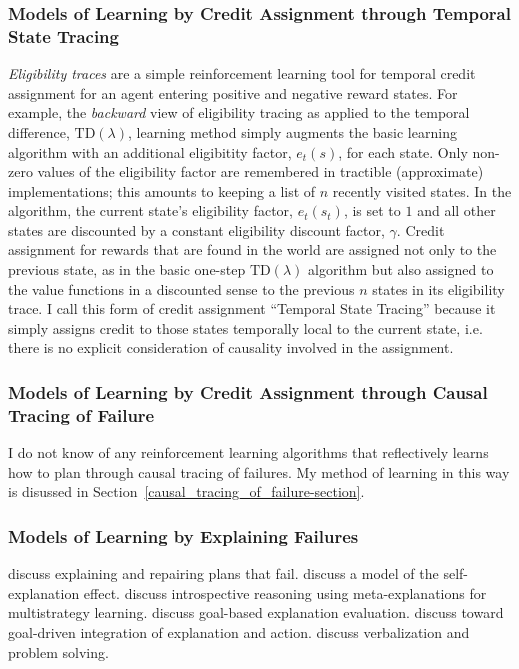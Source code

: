 \subsubsection{Models of Learning by Credit Assignment through Temporal State Tracing}

\emph{Eligibility traces} are a simple reinforcement learning tool for temporal credit assignment for an agent entering positive and negative reward states.
For example, the \emph{backward} view of eligibility tracing as applied to the temporal difference, $\text{TD}(\lambda)$, learning method simply augments the basic learning algorithm with an additional eligibitity factor, $e_t(s)$, for each state.
Only non-zero values of the eligibility factor are remembered in tractible (approximate) implementations; this amounts to keeping a list of $n$ recently visited states.
In the algorithm, the current state's eligibility factor, $e_t(s_t)$, is set to $1$ and all other states are discounted by a constant eligibility discount factor, $\gamma$.
Credit assignment for rewards that are found in the world are assigned not only to the previous state, as in the basic one-step $\text{TD}(\lambda)$ algorithm but also assigned to the value functions in a discounted sense to the previous $n$ states in its eligibility trace.
I call this form of credit assignment ``Temporal State Tracing'' because it simply assigns credit to those states temporally local to the current state, i.e. there is no explicit consideration of causality involved in the assignment.

\subsubsection{Models of Learning by Credit Assignment through Causal Tracing of Failure}

I do not know of any reinforcement learning algorithms that reflectively learns how to plan through causal tracing of failures.
My method of learning in this way is disussed in Section~\ref{causal_tracing_of_failure-section}.

\subsubsection{Models of Learning by Explaining Failures}

\cite{hammond:1990} discuss explaining and repairing plans that fail.
\cite{vanlehn:1992} discuss a model of the self-explanation effect.
\cite{ram:1995d} discuss introspective reasoning using meta-explanations for multistrategy learning.
\cite{leake:1995a} discuss goal-based explanation evaluation.
\cite{leake:1995b} discuss toward goal-driven integration of explanation and action.
\cite{dominowski:1998} discuss verbalization and problem solving.

